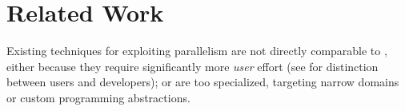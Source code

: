 \documentclass[letterpaper,twocolumn,10pt]{article}
\newcommand{\heading}[1]{\vspace{4pt}\noindent\textbf{#1}\enspace}
\newcommand{\ttt}[1]{\texttt{#1}}
\newcommand{\kk}[1]{[{\color{magenta}kk: #1}]}
\begin{document}
  

\section{Related Work}
\label{related}

Existing techniques for exploiting parallelism are not directly comparable to \sys, either because they require significantly more \emph{user} effort (see  for distinction between users and developers); or are too specialized, targeting narrow domains or custom programming abstractions.
\end{document}
